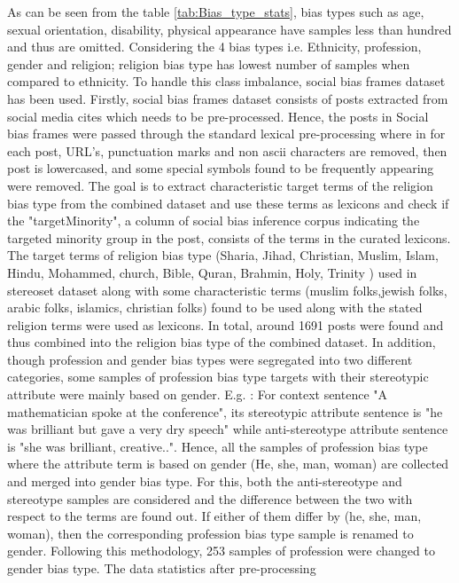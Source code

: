 As can be seen from the table \ref{tab:Bias_type_stats}, bias types such as age, sexual orientation, disability, physical appearance have samples less than hundred and thus are omitted. Considering the 4 bias types i.e. Ethnicity, profession, gender and religion; religion bias type has lowest number of samples when compared to ethnicity. To handle this class imbalance, social bias frames dataset has been used. Firstly, social bias frames dataset consists of posts extracted from social media cites which needs to be pre-processed. Hence, the posts in Social bias frames were passed through the standard lexical pre-processing where in for each post, URL's, punctuation marks and non ascii characters are removed, then post is lowercased, and some special symbols found to be frequently appearing were removed. The goal is to extract characteristic target terms of the religion bias type from the combined dataset and use these terms as lexicons and check if the "targetMinority", a column of social bias inference corpus indicating the targeted minority group in the post, consists of the terms in the curated lexicons. The target terms of religion bias type (Sharia, Jihad, Christian, Muslim, Islam, Hindu, Mohammed, church, Bible, Quran, Brahmin, Holy, Trinity \cite{nadeem2020stereoset}) used in stereoset dataset along with some characteristic terms (muslim folks,jewish folks, arabic folks, islamics, christian folks) found to be used along with the stated religion terms were used as lexicons. In total, around 1691 posts were found and thus combined into the religion bias type of the combined dataset. In addition, though profession and gender bias types were segregated into two different categories, some samples of profession bias type targets with their stereotypic attribute were mainly based on gender. E.g. : For context sentence "A mathematician spoke at the conference", its stereotypic attribute sentence is "he was brilliant but gave a very dry speech" while anti-stereotype attribute sentence is "she was brilliant, creative..". Hence, all the samples of profession bias type where the attribute term is based on gender (He, she, man, woman) are collected and merged into gender bias type. For this, both the anti-stereotype and stereotype samples are considered and the difference between the two with respect to the terms are found out. If either of them differ by (he, she, man, woman), then the corresponding profession bias type sample is renamed to gender. Following this methodology, 253 samples of profession were changed to gender bias type.  The data statistics after pre-processing    

